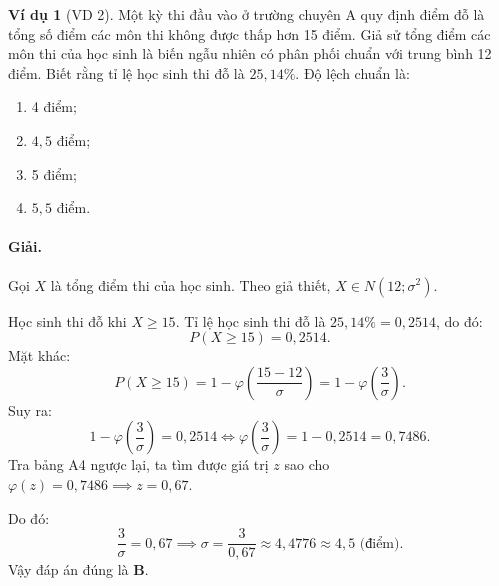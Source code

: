 \documentclass[12pt,a4paper]{article}
\theoremstyle{definition}
\newtheorem{vidu}{Ví dụ}[section]
\begin{document}
\begin{vidu}[VD 2]
Một kỳ thi đầu vào ở trường chuyên A quy định điểm đỗ là tổng số điểm các môn thi không được thấp hơn 15 điểm. Giả sử tổng điểm các môn thi của học sinh là biến ngẫu nhiên có phân phối chuẩn với trung bình 12 điểm. Biết rằng tỉ lệ học sinh thi đỗ là $25{,}14\%$. Độ lệch chuẩn là:
\begin{enumerate}[label=\Alph*.]
    \item 4 điểm;
    \item $4{,}5$ điểm;
    \item 5 điểm;
    \item $5{,}5$ điểm.
\end{enumerate}

\paragraph{Giải.}
Gọi $X$ là tổng điểm thi của học sinh. Theo giả thiết, $X \in N(12; \sigma^2)$.

Học sinh thi đỗ khi $X \ge 15$. Tỉ lệ học sinh thi đỗ là $25{,}14\% = 0{,}2514$, do đó:
\[
P(X \ge 15) = 0{,}2514.
\]
Mặt khác:
\[
P(X \ge 15) = 1 - \varphi\left(\frac{15 - 12}{\sigma}\right) = 1 - \varphi\left(\frac{3}{\sigma}\right).
\]
Suy ra:
\[
1 - \varphi\left(\frac{3}{\sigma}\right) = 0{,}2514 \iff \varphi\left(\frac{3}{\sigma}\right) = 1 - 0{,}2514 = 0{,}7486.
\]
Tra bảng A4 ngược lại, ta tìm được giá trị $z$ sao cho $\varphi(z) = 0{,}7486 \implies z = 0{,}67$.

Do đó:
\[
\frac{3}{\sigma} = 0{,}67 \implies \sigma = \frac{3}{0{,}67} \approx 4{,}4776 \approx 4{,}5 \text{ (điểm)}.
\]
Vậy đáp án đúng là \textbf{B}.
\end{vidu}
\end{document}
